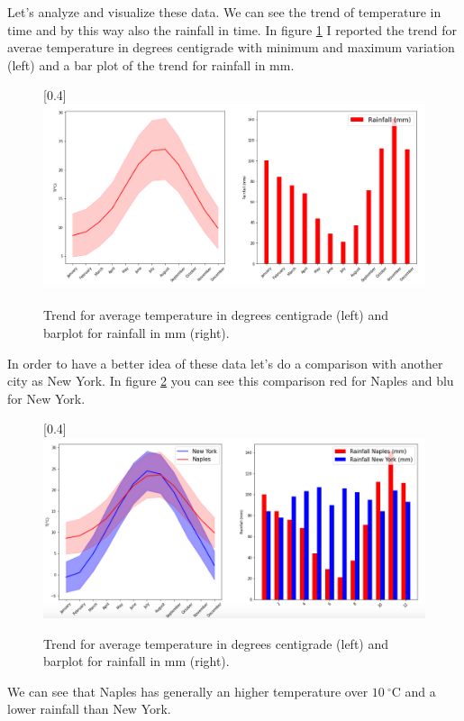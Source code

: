 \documentclass[a4paper, 12pt, oneside]{book}
\begin{document}
Let's analyze and visualize these data. 
We can see the trend of temperature in time and by this way also the rainfall in time. 
In figure \ref{fig:np_temp_rain} I reported the trend for averae temperature in degrees centigrade with minimum and maximum variation (left) and a bar plot of the trend for rainfall in mm.

\begin{figure}[!htb]
		\centering
		\scalebox{0.35}[0.4]{\includegraphics{immagini/np_temp_rain.png}}
		\caption{Trend for average temperature in degrees centigrade (left) and barplot for rainfall in mm (right).}
		\label{fig:np_temp_rain}
	\end{figure}

In order to have a better idea of these data let's do a comparison with another city as New York. In figure \ref{fig:ny_temp_rain} you can see this comparison red for Naples and blu for New York.

\begin{figure}[!htb]
		\centering
		\scalebox{0.35}[0.4]{\includegraphics{immagini/ny_temp_rain.png}}
		\caption{Trend for average temperature in degrees centigrade (left) and barplot for rainfall in mm (right).}
		\label{fig:ny_temp_rain}
	\end{figure}

We can see that Naples has generally an higher temperature over $10~ ^{\circ}$C and a lower rainfall than New York.
\end{document}

